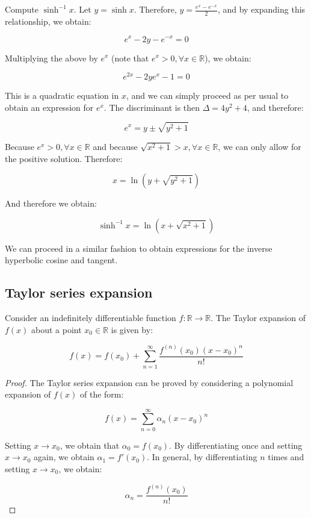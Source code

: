 \documentclass[12pt]{article}
\begin{document}
\begin{example}
    Compute $\sinh^{-1}{x}$.
    Let $y = \sinh{x}$. Therefore, $y = \frac{e^x - e^{-x}}{2}$, and by expanding this relationship, we obtain:

    \[ e^x - 2y - e^{-x} = 0 \]

    Multiplying the above by $e^x$ (note that $e^x > 0, \forall x \in \mathbb{R}$), we obtain:

    \[ e^{2x} - 2ye^x - 1 = 0 \]

    This is a quadratic equation in $x$, and we can simply proceed as per usual to obtain an expression for $e^x$. The discriminant is then $\Delta = 4y^2 + 4$, and therefore:

    \[ e^x = y \pm \sqrt{y^2 + 1} \]

    Because $e^x > 0, \forall x \in \mathbb{R}$ and because $\sqrt{x^2 + 1} > x, \forall x \in \mathbb{R}$, we can only allow for the positive solution. Therefore:

    \[ x = \ln{(y + \sqrt{y^2 + 1})} \]

    And therefore we obtain:

    \[ \sinh^{-1}{x} = \ln{(x + \sqrt{x^2 + 1})} \]
\end{example}

We can proceed in a similar fashion to obtain expressions for the inverse hyperbolic cosine and tangent.

\newpage

\subsection{Taylor series expansion}

\begin{theorem}
    Consider an indefinitely differentiable function $f : \mathbb{R} \to \mathbb{R}$. The Taylor expansion of $f(x)$ about a point $x_0 \in \mathbb{R}$ is given by:

    \[ f(x) = f(x_0) + \sum_{n = 1}^\infty \frac{f^{(n)}(x_0)(x - x_0)^n}{n!} \]
\end{theorem}

\begin{proof}
    The Taylor series expansion can be proved by considering a polynomial expansion of $f(x)$ of the form:

    \[ f(x) = \sum_{n = 0}^\infty \alpha_n(x - x_0)^n \]

    Setting $x \to x_0$, we obtain that $\alpha_0 = f(x_0)$. By differentiating once and setting $x \to x_0$ again, we obtain $\alpha_1 = f'(x_0)$. In general, by differentiating $n$ times and setting $x \to x_0$, we obtain:

    \[ \alpha_n = \frac{f^{(n)}(x_0)}{n!} \]
\end{proof}
\end{document}
